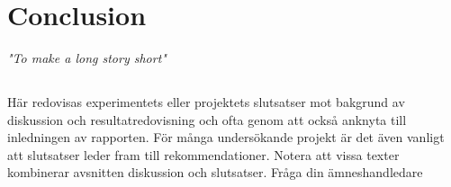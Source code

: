 \chapter{Conclusion}
\begin{center}
\vspace{-6ex}
\textit{"To make a long story short"}
\vspace{6ex}
\end{center}


\section{}

Här redovisas experimentets eller projektets slutsatser mot
bakgrund av diskussion och resultatredovisning och ofta genom
att också anknyta till inledningen av rapporten. För många
undersökande projekt är det även vanligt att slutsatser leder
fram till rekommendationer.
Notera att vissa texter kombinerar avsnitten diskussion och
slutsatser. Fråga din ämneshandledare
